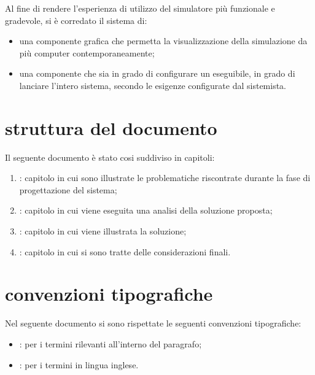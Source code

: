 Al fine di rendere l'esperienza di utilizzo del simulatore più funzionale e gradevole, si è corredato il sistema di:

\begin{itemize}
\item{una componente grafica che permetta la visualizzazione della simulazione da più computer contemporaneamente;}
\item{una componente che sia in grado di configurare un eseguibile, in grado di lanciare l'intero sistema, secondo le esigenze configurate dal sistemista.}
\end{itemize}

\section*{struttura del documento}
\label{introduzione-struttura-del-documento}
Il seguente documento è stato cosi suddiviso in capitoli:

\begin{enumerate}
\item{: capitolo in cui sono illustrate le problematiche riscontrate durante la fase di progettazione del sistema;}
\item{: capitolo in cui viene eseguita una analisi della soluzione proposta;}
\item{: capitolo in cui viene illustrata la soluzione;}
\item{: capitolo in cui si sono tratte delle considerazioni finali.}
\end{enumerate}

\section*{convenzioni tipografiche}
\label{introduzione-convenzioni-tipografiche}
Nel seguente documento si sono rispettate le seguenti convenzioni tipografiche:

\begin{itemize}
\item{: per i termini rilevanti all'interno del paragrafo;}
\item{: per i termini in lingua inglese.}
\end{itemize}